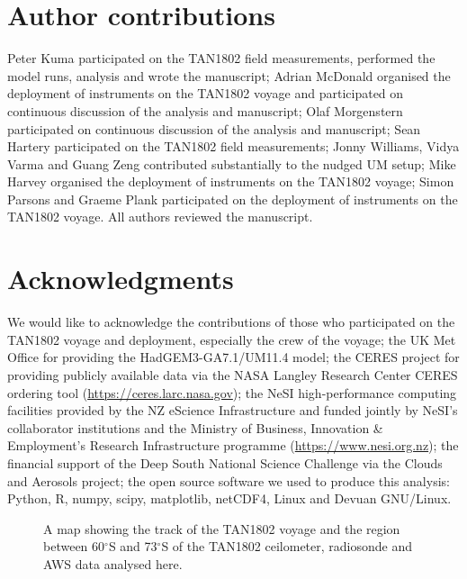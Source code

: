 \section*{Author contributions}

Peter Kuma participated on the TAN1802 field measurements, performed the model runs, analysis and wrote the manuscript;
Adrian McDonald organised the deployment of instruments on the TAN1802 voyage and participated on continuous discussion of the analysis
and manuscript;
Olaf Morgenstern participated on continuous discussion of the analysis and
manuscript;
Sean Hartery participated on the TAN1802 field measurements;
Jonny Williams, Vidya Varma and Guang Zeng contributed substantially to the
nudged UM setup;
Mike Harvey organised the deployment of instruments on the TAN1802 voyage;
Simon Parsons and Graeme Plank participated on the deployment of instruments on the TAN1802
voyage. All authors reviewed the manuscript.

\section*{Acknowledgments}

We would like to acknowledge the contributions of those who participated on
the TAN1802 voyage and deployment, especially the crew of the voyage; the UK Met
Office for providing the HadGEM3-GA7.1/UM11.4 model;
the CERES project for providing publicly available data via the NASA Langley
Research Center CERES ordering tool (\url{https://ceres.larc.nasa.gov});
the
NeSI high-performance computing facilities
provided by the NZ eScience Infrastructure and funded jointly by NeSI's
collaborator institutions and the Ministry of Business, Innovation \&
Employment's Research Infrastructure programme (\url{https://www.nesi.org.nz});
the financial support of the Deep South National Science Challenge via the Clouds and
Aerosols project; the open source software we used to produce this analysis: Python, R,
numpy, scipy, matplotlib,
netCDF4, Linux and Devuan GNU/Linux.

\clearpage

\begin{figure}[t]
\caption{A map showing the track of the TAN1802 voyage and the region
between 60$^\circ$S and 73$^\circ$S of the TAN1802 ceilometer, radiosonde
and AWS data analysed here.
}
\label{fig:map}
\end{figure}

\clearpage


